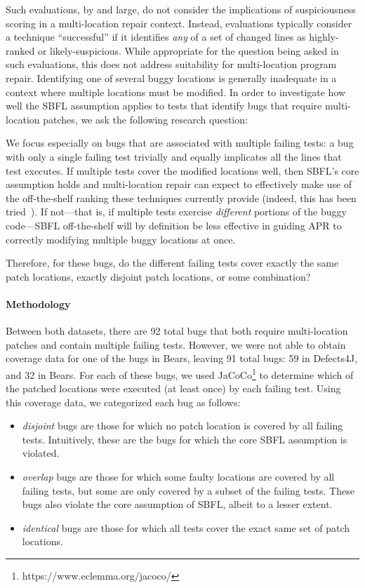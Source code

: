 Such evaluations, by and large, do not consider the implications of
suspiciousness scoring in a multi-location repair context.  Instead, evaluations
typically consider a technique ``successful'' if it identifies \emph{any} of a
set of changed lines as highly-ranked or likely-suspicious.  While appropriate
for the question being asked in such evaluations, this does not address
suitability for multi-location program repair.  Identifying one of several buggy
locations is generally inadequate in a context where multiple locations must be
modified. In order to investigate how well the SBFL assumption
applies to tests that identify bugs that require multi-location patches, we ask 
the following research question:



We focus especially on bugs that are associated with multiple failing tests: a bug
with only a single failing test trivially and equally implicates all the lines
that test executes.  If multiple tests cover the modified locations well, then
SBFL's core assumption holds and multi-location repair can expect to effectively
make use of the off-the-shelf ranking these techniques currently provide
(indeed, this has been tried~\cite{angelix}). If not---that is, if multiple
tests exercise \emph{different} portions of the buggy code---SBFL off-the-shelf
will by definition be less effective in guiding APR to correctly modifying
multiple buggy locations at once.

Therefore, for these bugs, do the different failing tests cover exactly the same
patch locations, exactly disjoint patch locations, or some combination?

\paragraph{Methodology}

Between both datasets, there are 92 total bugs that both require multi-location
patches and contain multiple failing tests. However, we were not able to obtain coverage 
data for one of the bugs in Bears, leaving 91 total bugs: 59 in Defects4J, and 32 in
Bears. 
For each of these bugs, we used JaCoCo\footnote{https://www.eclemma.org/jacoco/}
to determine which of the patched locations were executed (at least once) by
each failing test. Using this coverage data, we categorized each bug as follows:
\begin{itemize}
\item \emph{disjoint} bugs are those for which no patch location is covered by all
failing tests.  Intuitively, these are the bugs for which the core SBFL
assumption is violated.
\item \emph{overlap} bugs are those for which some faulty locations are covered
by all failing tests, but some are only covered by a subset of the failing
tests. These bugs also violate the core assumption of SBFL, albeit to a lesser
extent.
\item \emph{identical} bugs are those for which all tests cover the exact same
  set of patch locations.
\end{itemize}


